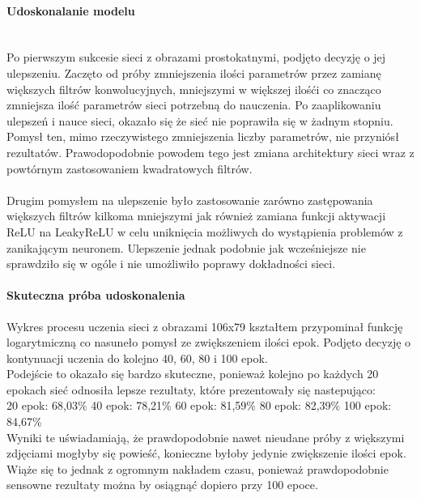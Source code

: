 \paragraph{Udoskonalanie modelu} \mbox{}\\
Po pierwszym sukcesie sieci z obrazami prostokatnymi, podjęto decyzję o jej ulepszeniu.
Zaczęto od próby zmniejszenia ilości parametrów przez zamianę większych filtrów konwolucyjnych,
mniejszymi w większej ilośći co znacząco zmniejsza ilość parametrów sieci potrzebną do nauczenia.
Po zaaplikowaniu ulepszeń i nauce sieci, okazało się że sieć nie poprawiła się w żadnym
stopniu. Pomysł ten, mimo rzeczywistego zmniejszenia liczby parametrów, nie przyniósł
rezultatów. Prawodopodobnie powodem tego jest zmiana architektury sieci wraz z powtórnym
zastosowaniem kwadratowych filtrów.\\\\
Drugim pomysłem na ulepszenie było zastosowanie zarówno zastępowania większych filtrów
kilkoma mniejszymi jak również zamiana funkcji aktywacji ReLU na LeakyReLU w celu uniknięcia
możliwych do wystąpienia problemów z zanikającym neuronem. Ulepszenie jednak podobnie
jak wcześniejsze nie sprawdziło się w ogóle i nie umożliwiło poprawy dokładności sieci.

\paragraph{Skuteczna próba udoskonalenia}
Wykres procesu uczenia sieci z obrazami 106x79 kształtem przypominał funkcję logarytmiczną
co nasuneło pomysł ze zwiększeniem ilości epok. Podjęto decyzję o kontynuacji uczenia
do kolejno 40, 60, 80 i 100 epok.\\
Podejście to okazało się bardzo skuteczne, ponieważ kolejno po każdych 20 epokach
sieć odnosiła lepsze rezultaty, które prezentowały się nastepująco:\\
20 epok: 68,03\%
40 epok: 78,21\%
60 epok: 81,59\%
80 epok: 82,39\%
100 epok: 84,67\%\\
Wyniki te uświadamiają, że prawdopodobnie nawet nieudane próby z większymi zdjęciami
mogłyby się powieść, konieczne byłoby jedynie zwiększenie ilości epok. Wiąże się to jednak
z ogromnym nakładem czasu, ponieważ prawdopodobnie sensowne rezultaty można by osiągnąć
dopiero przy 100 epoce.

